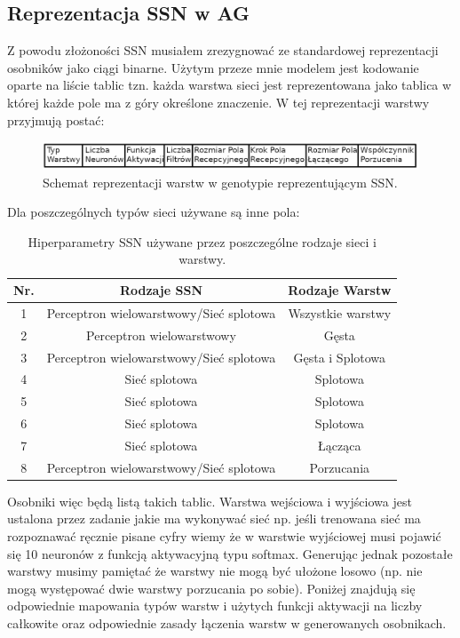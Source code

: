 \documentclass{article}
\begin{document}
\subsection{Reprezentacja SSN w AG}
\label{sec:ossn}
Z powodu złożoności SSN musiałem zrezygnować ze standardowej reprezentacji osobników 
jako ciągi binarne. Użytym przeze mnie modelem jest kodowanie oparte na liście tablic tzn.
każda warstwa sieci jest reprezentowana jako tablica w której każde pole ma z góry określone 
znaczenie. W tej reprezentacji warstwy przyjmują postać:\\
\begin{figure}[H]
\centering
\includegraphics[scale=0.30]{dnn_genome.png}
\caption{Schemat reprezentacji warstw w genotypie reprezentującym SSN.}
\end{figure}
Dla poszczególnych typów sieci używane są inne pola:\\
\begin{table}[H]
\centering
\begin{tabular}{|c|c|c|}
	\hline
	Nr. & Rodzaje SSN & Rodzaje Warstw\\
	\hline
	1 & Perceptron wielowarstwowy/Sieć splotowa & Wszystkie warstwy\\
	2 & Perceptron wielowarstwowy & Gęsta\\
	3 & Perceptron wielowarstwowy/Sieć splotowa & Gęsta i Splotowa \\
	4 & Sieć splotowa & Splotowa\\
	5 & Sieć splotowa & Splotowa\\
	6 & Sieć splotowa & Splotowa\\
	7 & Sieć splotowa & Łącząca\\
	8 & Perceptron wielowarstwowy/Sieć splotowa & Porzucania\\
	\hline
\end{tabular}
\caption{\label{tab:zakres}Hiperparametry SSN używane przez poszczególne rodzaje sieci i 
         warstwy.}
\end{table}

Osobniki więc będą listą takich tablic.
Warstwa wejściowa i wyjściowa jest ustalona 
przez zadanie jakie ma wykonywać sieć np. jeśli trenowana sieć ma rozpoznawać ręcznie pisane
cyfry wiemy że w warstwie  wyjściowej musi pojawić się 10 neuronów z funkcją aktywacyjną
typu softmax.
Generując jednak pozostałe warstwy musimy pamiętać że warstwy nie mogą być ułożone losowo
(np. nie mogą występować dwie warstwy porzucania po sobie). Poniżej znajdują się odpowiednie
mapowania typów warstw i użytych funkcji aktywacji na liczby całkowite oraz odpowiednie zasady 
łączenia warstw w generowanych osobnikach.\\
\end{document}
